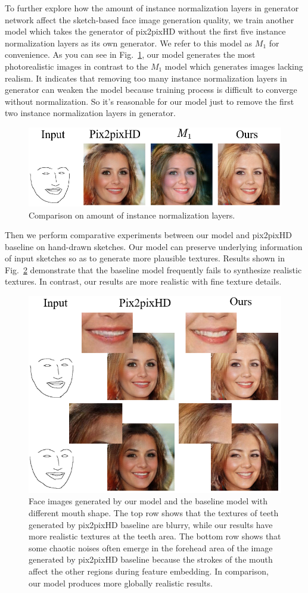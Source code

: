 \documentclass[10pt,twocolumn,letterpaper]{article}
\begin{document}
To further explore how the amount of instance normalization layers in generator network affect the sketch-based face image generation quality, we train another model which takes the generator of pix2pixHD without the first five instance normalization layers as its own generator. We refer to this model as $M_1$ for convenience.
As you can see in Fig.~\ref{fig:ablation}, our model generates the most photorealistic images in contrast to the $M_1$ model which generates images lacking realism. 
It indicates that removing too many instance normalization layers in generator can weaken the model because training process is difficult to converge without normalization.
So it's reasonable for our model just to remove the first two instance normalization layers in generator. 
\begin{figure}[htb]
	\centering
	\includegraphics[width=\columnwidth ]{ablation.png}
	\caption{Comparison on amount of instance normalization layers.}
	\label{fig:ablation}
\end{figure}  

Then we perform comparative experiments between our model and pix2pixHD baseline on hand-drawn sketches.
Our model can preserve underlying information of input sketches so as to generate more plausible textures.
Results shown in Fig.~\ref{fig:compare_1} demonstrate that the baseline model frequently fails to synthesize realistic textures. 
In contrast, our results are more realistic with fine texture details.  
\begin{figure}[htb]
	\centering
	\includegraphics[width=0.45 \textwidth]{texture.png}
	\caption{Face images generated by our model and the baseline model with different mouth shape. The top row shows that the textures of teeth generated by pix2pixHD baseline are blurry, while our results have more realistic textures at the teeth area. The bottom row shows that some chaotic noises often emerge in the forehead area of the image generated by pix2pixHD baseline because the strokes of the mouth affect the other regions during feature embedding. In comparison, our model produces more globally realistic results.}
	\label{fig:compare_1}
\end{figure}
\end{document}
